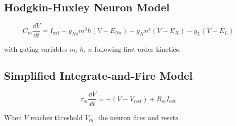 \subsection{Hodgkin-Huxley Neuron Model}

\begin{equation}
C_m\frac{\dd V}{\dd t} = I_{\text{ext}} - g_{Na}m^3h(V - E_{Na}) - g_K n^4(V - E_K) - g_L(V - E_L)
\end{equation}

with gating variables $m$, $h$, $n$ following first-order kinetics.

\subsection{Simplified Integrate-and-Fire Model}

\begin{equation}
\tau_m\frac{\dd V}{\dd t} = -(V - V_{\text{rest}}) + R_m I_{\text{ext}}
\end{equation}

When $V$ reaches threshold $V_{th}$, the neuron fires and resets.

